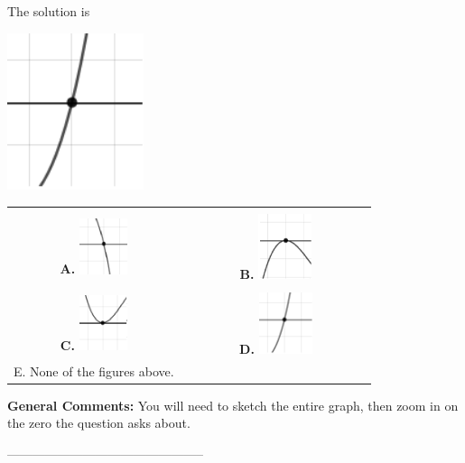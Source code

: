 \documentclass{article}[14pt]
\begin{document}
 
 The solution is  
 \begin{center} \includegraphics[width=0.3\textwidth]{../Figures/zeroBehaviorPositiveOddB.png} \end{center}\begin{tabular}{|c|c|} 
\hline 
 & \tabularnewline 
 \textbf{A.} \includegraphics[width=0.3\textwidth]{../Figures/zeroBehaviorNegativeOddB.png} & \textbf{B.} \includegraphics[width=0.3\textwidth]{../Figures/zeroBehaviorNegativeEvenB.png} \tabularnewline 
\hline 
 & \tabularnewline 
 \textbf{C.} \includegraphics[width=0.3\textwidth]{../Figures/zeroBehaviorPositiveEvenB.png} & \textbf{D.} \includegraphics[width=0.3\textwidth]{../Figures/zeroBehaviorPositiveOddB.png} \tabularnewline 
\hline 
 E. None of the figures above. & \tabularnewline 
\hline 
 \end{tabular} 
 
\textbf{General Comments:} You will need to sketch the entire graph, then zoom in on the zero the question asks about.

-----------------------------------------------
\end{document}

